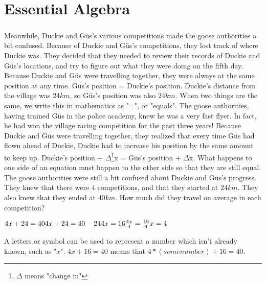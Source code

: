 \chapter{Essential Algebra}
\paragraph{} Meanwhile, Duckie and Güs's various competitions made the goose authorities a bit confused. Because of Duckie and Güs's competitions, they lost track of where Duckie was. They decided that they needed to review their records of Duckie and Güs's locations, and try to figure out what they were doing on the fifth day. 
\vfill
\pagebreak
{Because Duckie and Güs were travelling together, they were always at the same position at any time.}
{Güs's position = Duckie's position. Duckie's distance from the village was $24km$, so Güs's position was also $24km$.}
{When two things are the same, we write this in mathematics as "=", or "equals".}
{}
{The goose authorities, having trained Güs in the police academy, knew he was a very fast flyer. In fact, he had won the village racing competition for the past three years! Because Duckie and Güs were travelling together, they realized that every time Güs had flown ahead of Duckie, Duckie had to increase his position by the same amount to keep up.}
{Duckie's position + $\Delta$\footnote{$\Delta$ means "change in"}x = Güs's position + $\Delta$x.}
{What happens to one side of an equation must happen to the other side so that they are still equal.}
{}
{The goose authorities were still a bit confused about Duckie and Güs's progress. They knew that there were $4$ competitions, and that they started at $24 km$. They also knew that they ended at $40 km$. How much did they travel on average in each competition?}
{\begin{center}$4x + 24 = 40 \linebreak 4x + 24 = 40 - 24 \linebreak 4x = 16 \linebreak \frac{4x}{4} = \frac{16}{4} \linebreak x = 4  $\end{center}}
{A letters or symbol can be used to represent a number which isn’t already known, such as "$x$". $4x + 16 = 40$ means that $4*(some number) + 16 = 40$.}
{}